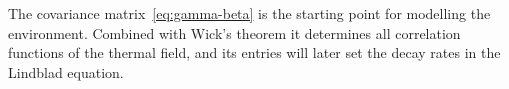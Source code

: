 \begin{intuition}
  The covariance matrix~\eqref{eq:gamma-beta} is the starting point
  for modelling the environment.  Combined with Wick's theorem it
  determines all correlation functions of the thermal field, and its
  entries will later set the decay rates in the Lindblad equation.
\end{intuition}
